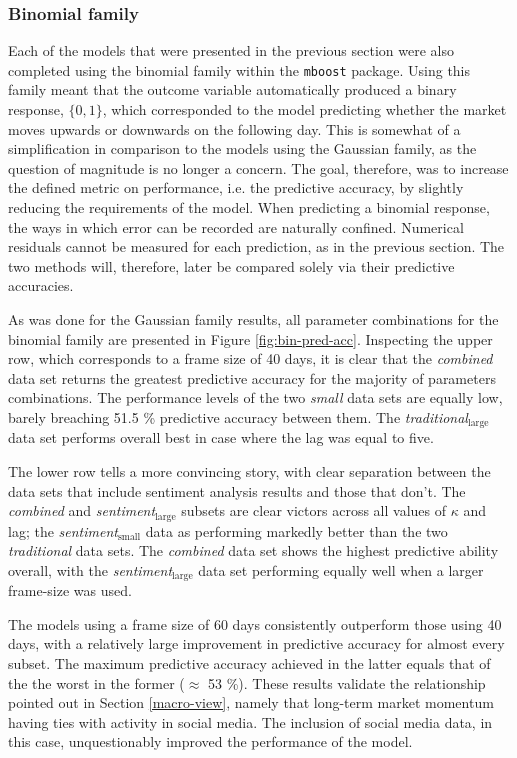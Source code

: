 \documentclass{article}
\begin{document}
\subsubsection{Binomial family  \label{results-bin}}
\label{sec-1-4-3}

Each of the models that were presented in the previous section were also completed using the binomial family within the \texttt{mboost} package. Using this family meant that the outcome variable automatically produced a binary response, $\{0, 1\}$, which corresponded to the model predicting whether the market moves upwards or downwards on the following day. This is somewhat of a simplification in comparison to the models using the Gaussian family, as the question of magnitude is no longer a concern. The goal, therefore, was to increase the defined metric on performance, i.e. the predictive accuracy, by slightly reducing the requirements of the model. When predicting a binomial response, the ways in which error can be recorded are naturally confined. Numerical residuals cannot be measured for each prediction, as in the previous section. The two methods will, therefore, later be compared solely via their predictive accuracies.

As was done for the Gaussian family results, all parameter combinations for the binomial family are presented in Figure \ref{fig:bin-pred-acc}. Inspecting the upper row, which corresponds to a frame size of 40 days, it is clear that the \emph{combined} data set returns the greatest predictive accuracy for the majority of parameters combinations. The performance levels of the two \emph{small} data sets are equally low, barely breaching 51.5 \% predictive accuracy between them. The \emph{traditional$_{\text{large}}$} data set performs overall best in case where the lag was equal to five.

The lower row tells a more convincing story, with clear separation between the data sets that include sentiment analysis results and those that don't. The \emph{combined} and \emph{sentiment$_{\text{large}}$} subsets are clear victors across all values of $\kappa$ and lag; the \emph{sentiment$_{\text{small}}$} data  as performing markedly better than the two \emph{traditional} data sets. The \emph{combined} data set shows the highest predictive ability overall, with the \emph{sentiment$_{\text{large}}$} data set performing equally well when a larger frame-size was used. 

The models using a frame size of 60 days consistently outperform those using 40 days, with a relatively large improvement in predictive accuracy for almost every subset. The maximum predictive accuracy achieved in the latter equals that of the the worst in the former ($\approx$ 53 \%). These results validate the relationship pointed out in Section \ref{macro-view}, namely that long-term market momentum having ties with activity in social media. The inclusion of social media data, in this case, unquestionably improved the performance of the model.
\end{document}
